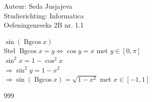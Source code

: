 \documentclass[a4paper]{article}
\begin{document}
\noindent \large Auteur: Seda Jusjajeva\\
\noindent \large Studierichting: Informatica\\
\noindent \large Oefeningenreeks 2B nr. 1.1 \\

\medskip

\normalsize

$\sin(\operatorname{Bgcos}x)$  \\

Stel $\operatorname{Bgcos}x = y \Leftrightarrow \cos y = x$ met $y\in\left[0,\pi\right]$ \\

$\sin ^2 x = 1 - \cos ^2 x$ \\

$\Rightarrow\sin^2 y = 1 - x^2$ \\

$\Rightarrow\sin(\operatorname{Bgcos}x) = \sqrt{1-x^2}$ met $x \in \left[-1,1\right]$ \\


\begin{thebibliography}{999}
\end{thebibliography}
\end{document}
